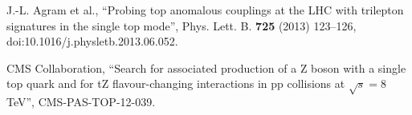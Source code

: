 \documentclass[12pt]{article}
\begin{document}
\begin{thebibliography}{99}
 J.-L. Agram et al., \textquotedblleft Probing top anomalous couplings at the LHC with trilepton signatures in the single top mode\textquotedblright , Phys. Lett. B. {\bf 725} (2013) 123–126, doi:10.1016/j.physletb.2013.06.052.
 
CMS Collaboration, \textquotedblleft Search for associated production of a Z boson with a single top quark and for tZ flavour-changing interactions in pp collisions at $\sqrt{s} = 8$ TeV\textquotedblright , CMS-PAS-TOP-12-039.

\end{thebibliography}

 
\end{document}
